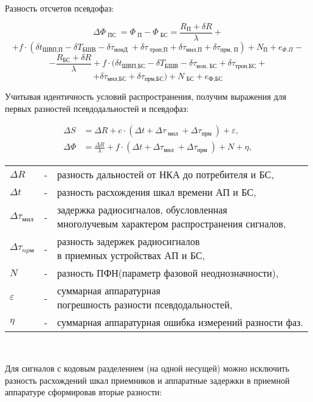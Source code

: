 \documentclass[14pt,a4paper,oneside]{extarticle}
\begin{document}
Разность отсчетов псевдофаз:

\[\Delta\Phi_{\text{ ПС }}=\Phi_{\text{ П}}-\Phi_{\text{ БС}}=\frac{R_{\text{П}}+\delta R}{\lambda}+\]
\[+f\cdot(\delta t_{\text{ШВП,П}}-\delta T_{\text{БШВ}}-\delta\tau_{\text{ионД }}+\delta\tau_{\text{ троп,П}}+\delta\tau_{\text{мнл,П}}+\delta\tau_{\text{прм, П}})+N_{\text{П}}+e_{\Phi.\Pi}-\]
\[-\frac{R_{\text{БС}}+\delta R}{\lambda}+f\cdot(\delta t_{\text{ШВП,БС}}-\delta T_{\text{БШВ}}-\delta\tau_{\text{иoн, БС}}+\delta\tau_{\text{троп,БС}}+\]
\[+\delta\tau_{\text{мнл,БС}}+\delta\tau_{\text{прм,БС}})+N_{\text{ БС}}+e_\text{Ф,БС}\]

Учитывая идентичность условий распространения, получим выражения для первых разностей псевдодальностей и псевдофаз:

\[\begin{aligned}\Delta S&=\Delta R+c\cdot(\Delta t+\Delta\tau_\text{ мнл }+\Delta\tau_\text{прм })+\varepsilon,\\\Delta\Phi&=\frac{\Delta R}{\lambda}+f\cdot(\Delta t+\Delta\tau_\text{мнл }+\Delta\tau_\text{прм })+N+\eta,\end{aligned}\]

\begin{tabular}{ l c l }
    $\Delta R$                & - & разность дальностей от НКА до потребителя и БС,       \\
    $\Delta t$                & - & разность расхождения шкал времени АП и БС,            \\
    $\Delta \tau_\text{мнл}$  & - & \makecell[l]{задержка радиосигналов, обусловленная    \\ многолучевым характером распространения сигналов,} \\
    $\Delta\tau_{np\text{м}}$ & - & \makecell[l]{разность задержек радиосигналов          \\ в приемных устройствах АП и БС,} \\
    $N$                       & - & разность ПФН(параметр фазовой неоднозначности),       \\
    $\varepsilon$             & - & \makecell[l]{суммарная аппаратурная                   \\ погрешность разности псевдодальностей,} \\
    $\eta $                   & - & суммарная аппаратурная ошибка измерений разности фаз. \\
\end{tabular}

\

Для сигналов с кодовым разделением (на одной несущей) можно исключить разность расхождений шкал приемников и аппаратные задержки в приемной аппаратуре сформировав вторые разности:
\end{document}
